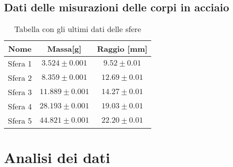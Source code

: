 \documentclass{article}
\begin{document}
\subsection{Dati delle misurazioni delle corpi in acciaio}
\begin{table}[H]
    \centering
    \begin{tabular}{|c|c|c|}
        \hline
        Nome & Massa[g] & Raggio [mm] \\
        \hline
        Sfera 1 & $3.524 \pm 0.001$ & $9.52 \pm 0.01$ \\
        Sfera 2 & $8.359 \pm 0.001$ & $12.69 \pm 0.01$ \\
        Sfera 3 & $11.889 \pm 0.001$ & $14.27 \pm 0.01$ \\
        Sfera 4 & $28.193 \pm 0.001$ & $19.03 \pm 0.01$ \\
        Sfera 5 & $44.821 \pm 0.001$ & $22.20 \pm 0.01$ \\
        \hline
    \end{tabular}
    \caption{Tabella con gli ultimi dati delle sfere}
    \label{tab:dati_sfere}
\end{table}





\section{Analisi dei dati}
\end{document}
